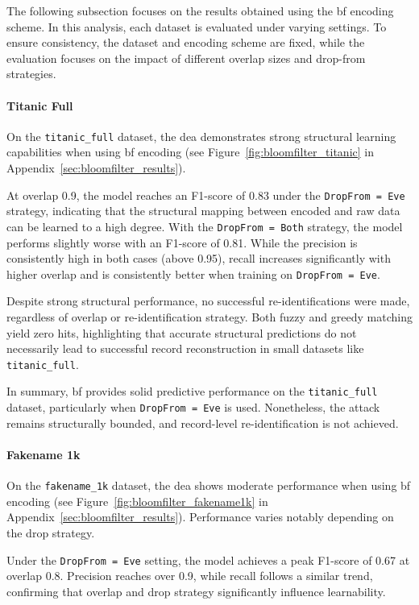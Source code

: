 The following subsection focuses on the results obtained using the \ac{bf} encoding scheme.
In this analysis, each dataset is evaluated under varying settings.
To ensure consistency, the dataset and encoding scheme are fixed, while the evaluation focuses on the impact of different overlap sizes and drop-from strategies.

\paragraph{Titanic Full}

On the \texttt{titanic\_full} dataset, the \ac{dea} demonstrates strong structural learning capabilities when using \ac{bf} encoding (see Figure~\ref{fig:bloomfilter_titanic} in Appendix~\ref{sec:bloomfilter_results}).

At overlap 0.9, the model reaches an F1-score of 0.83 under the \texttt{DropFrom = Eve} strategy, indicating that the structural mapping between encoded and raw data can be learned to a high degree.
With the \texttt{DropFrom = Both} strategy, the model performs slightly worse with an F1-score of 0.81.
While the precision is consistently high in both cases (above 0.95), recall increases significantly with higher overlap and is consistently better when training on \texttt{DropFrom = Eve}.

Despite strong structural performance, no successful re-identifications were made, regardless of overlap or re-identification strategy.
Both fuzzy and greedy matching yield zero hits, highlighting that accurate structural predictions do not necessarily lead to successful record reconstruction in small datasets like \texttt{titanic\_full}.

In summary, \ac{bf} provides solid predictive performance on the \texttt{titanic\_full} dataset, particularly when \texttt{DropFrom = Eve} is used.
Nonetheless, the attack remains structurally bounded, and record-level re-identification is not achieved.

\paragraph{Fakename 1k}

On the \texttt{fakename\_1k} dataset, the \ac{dea} shows moderate performance when using \ac{bf} encoding (see Figure~\ref{fig:bloomfilter_fakename1k} in Appendix~\ref{sec:bloomfilter_results}).
Performance varies notably depending on the drop strategy.

Under the \texttt{DropFrom = Eve} setting, the model achieves a peak F1-score of 0.67 at overlap 0.8.
Precision reaches over 0.9, while recall follows a similar trend, confirming that overlap and drop strategy significantly influence learnability.

